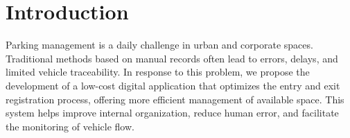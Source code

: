 \section{Introduction}

Parking management is a daily challenge in urban and corporate spaces. Traditional methods based on manual records often lead to errors, delays, and limited vehicle traceability. In response to this problem, we propose the development of a low-cost digital application that optimizes the entry and exit registration process, offering more efficient management of available space. This system helps improve internal organization, reduce human error, and facilitate the monitoring of vehicle flow.


